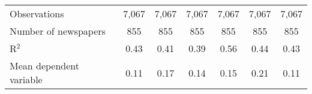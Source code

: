 {\begin{tabular}{l*{6}{c}}
\midrule
Observations        &       7,067         &       7,067         &       7,067         &       7,067         &       7,067         &       7,067         \\
Number of newspapers&         855         &         855         &         855         &         855         &         855         &         855         \\
R$^2$               &        0.43         &        0.41         &        0.39         &        0.56         &        0.44         &        0.43         \\
Mean dependent variable&        0.11         &        0.17         &        0.14         &        0.15         &        0.21         &        0.11         \\
\bottomrule
\end{tabular}
}

